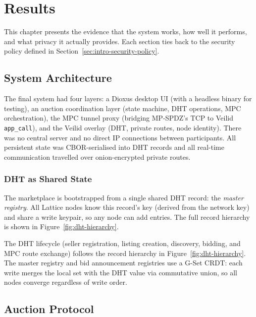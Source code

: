 
\section{Results}
\label{sec:results}

This chapter presents the evidence that the system works, how well it performs,
and what privacy it actually provides.  Each section ties back to the security
policy defined in Section~\ref{sec:intro-security-policy}.

\subsection{System Architecture}
\label{sec:results-architecture}

The final system had four layers: a Dioxus desktop UI (with a headless
binary for testing), an auction coordination layer (state machine, DHT
operations, MPC orchestration), the MPC tunnel proxy (bridging MP-SPDZ's
TCP to Veilid \texttt{app\_call}), and the Veilid overlay (DHT, private
routes, node identity).  There was no central server and no direct IP
connections between participants.  All persistent state was CBOR-serialised
into DHT records and all real-time communication travelled over
onion-encrypted private routes.

\subsubsection{DHT as Shared State}

The marketplace is bootstrapped from a single shared DHT record: the
\emph{master registry}.  All Lattice nodes know this record's key (derived
from the network key) and share a write keypair, so any node can add entries.
The full record hierarchy is shown in Figure~\ref{fig:dht-hierarchy}.

The DHT lifecycle (seller registration, listing creation, discovery, bidding,
and MPC route exchange) follows the record hierarchy in
Figure~\ref{fig:dht-hierarchy}.  The master registry and bid announcement
registries use a G-Set CRDT: each write merges the local set with the DHT
value via commutative union, so all nodes converge regardless of write order.

\subsection{Auction Protocol}
\label{sec:results-protocol}

